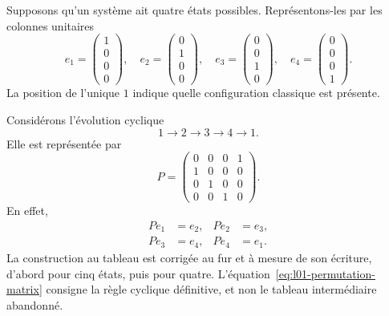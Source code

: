 Supposons qu’un système ait quatre états possibles. Représentons-les par les colonnes unitaires
\begin{equation}
  e_1=
  \begin{pmatrix}1\\0\\0\\0\end{pmatrix},
  \quad
  e_2=
  \begin{pmatrix}0\\1\\0\\0\end{pmatrix},
  \quad
  e_3=
  \begin{pmatrix}0\\0\\1\\0\end{pmatrix},
  \quad
  e_4=
  \begin{pmatrix}0\\0\\0\\1\end{pmatrix}.
  \label{eq:l01-one-hot}
\end{equation}
La position de l’unique \(1\) indique quelle configuration classique est présente.

Considérons l’évolution cyclique
\begin{equation}
  1\longrightarrow2\longrightarrow3\longrightarrow4\longrightarrow1.
  \label{eq:l01-four-cycle}
\end{equation}
Elle est représentée par
\begin{equation}
  P=
  \begin{pmatrix}
    0&0&0&1\\
    1&0&0&0\\
    0&1&0&0\\
    0&0&1&0
  \end{pmatrix}.
  \label{eq:l01-permutation-matrix}
\end{equation}
En effet,
\begin{equation}
  \begin{aligned}
    Pe_1&=e_2, & Pe_2&=e_3,\\
    Pe_3&=e_4, & Pe_4&=e_1.
  \end{aligned}
\end{equation}
La construction au tableau est corrigée au fur et à mesure de son écriture, d’abord pour cinq états, puis pour quatre. L’équation~\eqref{eq:l01-permutation-matrix} consigne la règle cyclique définitive, et non le tableau intermédiaire abandonné.

